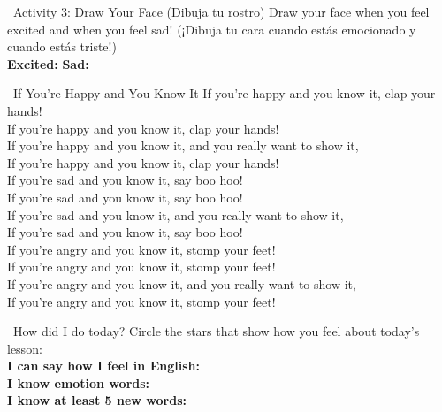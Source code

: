 \begin{activity}{ \ Activity 3: Draw Your Face (Dibuja tu rostro)}
  Draw your face when you feel excited and when you feel sad! (¡Dibuja tu cara cuando estás emocionado y cuando estás triste!)\\[1em]
  \textbf{Excited:} \hspace{5cm} \textbf{Sad:}\\
  \vspace{3cm}
\end{activity}

\begin{songbox}{ \ If You're Happy and You Know It}
  If you're happy and you know it, clap your hands!\\
  If you're happy and you know it, clap your hands!\\
  If you're happy and you know it, and you really want to show it,\\
  If you're happy and you know it, clap your hands!\\[1em]
  If you're sad and you know it, say boo hoo!\\
  If you're sad and you know it, say boo hoo!\\
  If you're sad and you know it, and you really want to show it,\\
  If you're sad and you know it, say boo hoo!\\[1em]
  If you're angry and you know it, stomp your feet!\\
  If you're angry and you know it, stomp your feet!\\
  If you're angry and you know it, and you really want to show it,\\
  If you're angry and you know it, stomp your feet!
\end{songbox}

\vspace{1em}
\begin{grammartip}{ \ How did I do today?}
  Circle the stars that show how you feel about today's lesson:\\[6pt]
  \textbf{I can say how I feel in English:} \selfcheck[0] \\[4pt]
  \textbf{I know emotion words:} \selfcheck[0] \\[4pt]
  \textbf{I know at least 5 new words:} \selfcheck[0]
\end{grammartip}
